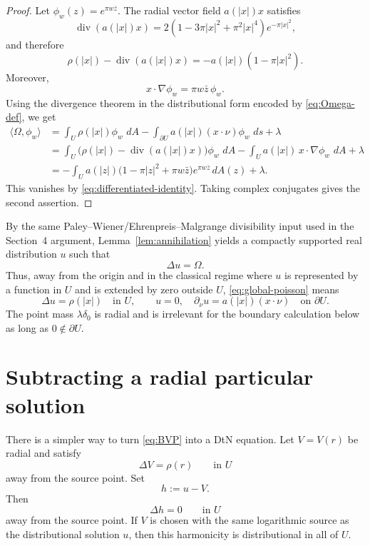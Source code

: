 \documentclass[11pt]{article}
\newcommand{\dd}{\,d}
\newcommand{\1}{\mathbf 1}
\begin{document}
\begin{proof}
Let \(\phi_w(z)=e^{\pi w\bar z}\).  The radial vector field \(a(|x|)x\) satisfies
\[
  \operatorname{div}(a(|x|)x)
  =
  2(1-3\pi |x|^2+\pi^2|x|^4)e^{-\pi |x|^2},
\]
and therefore
\begin{equation}\label{eq:rho-div-identity}
  \rho(|x|)-\operatorname{div}(a(|x|)x)
  =
  -a(|x|)(1-\pi |x|^2).
\end{equation}
Moreover,
\[
  x\cdot\nabla\phi_w=\pi w\bar z\,\phi_w .
\]
Using the divergence theorem in the distributional form encoded by
\eqref{eq:Omega-def}, we get
\begin{align*}
  \langle\Omega,\phi_w\rangle
  &=
  \int_U \rho(|x|)\phi_w\,\dd A
  -
  \int_{\partial U}a(|x|)(x\cdot\nu)\phi_w\,\dd s
  +\lambda \\
  &=
  \int_U
  \bigl(\rho(|x|)-\operatorname{div}(a(|x|)x)\bigr)\phi_w\,\dd A
  -
  \int_U a(|x|)\,x\cdot\nabla\phi_w\,\dd A
  +\lambda \\
  &=
  -\int_U a(|z|)
  \bigl(1-\pi |z|^2+\pi w\bar z\bigr)e^{\pi w\bar z}\dd A(z)
  +\lambda .
\end{align*}
This vanishes by \eqref{eq:differentiated-identity}.  Taking complex conjugates gives
the second assertion.
\end{proof}

By the same Paley--Wiener/Ehrenpreis--Malgrange divisibility input used in the
Section~4 argument, Lemma~\ref{lem:annihilation} yields a compactly supported real
distribution \(u\) such that
\begin{equation}\label{eq:global-poisson}
  \Delta u=\Omega .
\end{equation}
Thus, away from the origin and in the classical regime where \(u\) is represented by a
function in \(U\) and is extended by zero outside \(U\), \eqref{eq:global-poisson}
means
\begin{equation}\label{eq:BVP}
  \Delta u=\rho(|x|)
  \quad\text{in }U,\qquad
  u=0,\quad
  \partial_\nu u=a(|x|)(x\cdot\nu)
  \quad\text{on }\partial U .
\end{equation}
The point mass \(\lambda\delta_0\) is radial and is irrelevant for the boundary
calculation below as long as \(0\notin\partial U\).

\section{Subtracting a radial particular solution}

There is a simpler way to turn \eqref{eq:BVP} into a DtN equation.  Let \(V=V(r)\)
be radial and satisfy
\[
  \Delta V=\rho(r)
  \qquad\text{in }U
\]
away from the source point.  Set
\[
  h:=u-V .
\]
Then
\[
  \Delta h=0
  \qquad\text{in }U
\]
away from the source point.  If \(V\) is chosen with the same logarithmic source as
the distributional solution \(u\), then this harmonicity is distributional in all of
\(U\).
\end{document}
